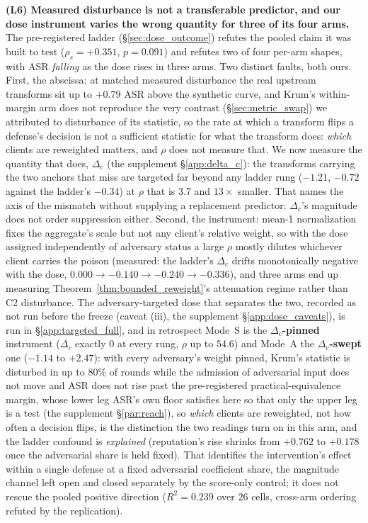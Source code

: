 \documentclass{article}
\begin{document}
\textbf{(L6) Measured disturbance is not a transferable predictor, and our dose instrument varies the wrong quantity for three of its four arms.} The pre-registered ladder (§\ref{sec:dose_outcome}) refutes the pooled claim it was built to test ($\rho_s = +0.351$, $p = 0.091$) and refutes two of four per-arm shapes, with ASR \emph{falling} as the dose rises in three arms. Two distinct faults, both ours. First, the abscissa: at matched measured disturbance the real upstream transforms sit up to $+0.79$ ASR above the synthetic curve, and Krum's within-margin arm does not reproduce the very contrast (§\ref{sec:metric_swap}) we attributed to disturbance of its statistic, so the rate at which a transform flips a defense's decision is not a sufficient statistic for what the transform does: \emph{which} clients are reweighted matters, and $\rho$ does not measure that. We now measure the quantity that does, $\Delta_c$ (the supplement §\ref{app:delta_c}): the transforms carrying the two anchors that miss are targeted far beyond any ladder rung ($-1.21$, $-0.72$ against the ladder's $-0.34$) at $\rho$ that is $3.7$ and $13\times$ smaller. That names the axis of the mismatch without supplying a replacement predictor: $\Delta_c$'s magnitude does not order suppression either. Second, the instrument: mean-1 normalization fixes the aggregate's scale but not any client's relative weight, so with the dose assigned independently of adversary status a large $\rho$ mostly dilutes whichever client carries the poison (measured: the ladder's $\Delta_c$ drifts monotonically negative with the dose, $0.000 \to -0.140 \to -0.240 \to -0.336$), and three arms end up measuring Theorem~\ref{thm:bounded_reweight}'s attenuation regime rather than C2 disturbance. The adversary-targeted dose that separates the two, recorded as not run before the freeze (caveat (iii), the supplement §\ref{app:dose_caveats}), is run in §\ref{app:targeted_full}, and in retrospect Mode~S is the \textbf{$\Delta_c$-pinned} instrument ($\Delta_c$ exactly $0$ at every rung, $\rho$ up to $54.6$) and Mode~A the \textbf{$\Delta_c$-swept} one ($-1.14$ to $+2.47$): with every adversary's weight pinned, Krum's statistic is disturbed in up to $80\%$ of rounds while the admission of adversarial input does not move and ASR does not rise past the pre-registered practical-equivalence margin, whose lower leg ASR's own floor satisfies here so that only the upper leg is a test (the supplement §\ref{par:reach}), so \emph{which} clients are reweighted, not how often a decision flips, is the distinction the two readings turn on in this arm, and the ladder confound is \emph{explained} (reputation's rise shrinks from $+0.762$ to $+0.178$ once the adversarial share is held fixed). That identifies the intervention's effect within a single defense at a fixed adversarial coefficient share, the magnitude channel left open and closed separately by the score-only control; it does not rescue the pooled positive direction ($R^2 = 0.239$ over $26$ cells, cross-arm ordering refuted by the replication).
\end{document}
